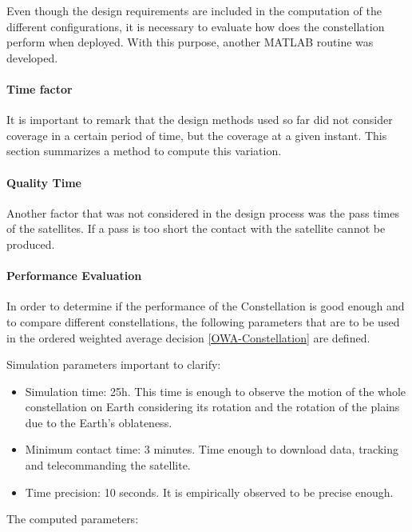 Even though the design requirements are included in the computation of the different configurations, it is necessary to evaluate how does the constellation perform when deployed. With this purpose, another MATLAB routine was developed. 

\paragraph{Time factor}It is important to remark that the design methods used so far did not consider coverage in a certain period of time, but the coverage at a given instant. This section summarizes a method to compute this variation.

\paragraph{Quality Time}Another factor that was not considered in the design process was the pass times of the satellites. If a pass is too short the contact with the satellite cannot be produced. 

\paragraph{Performance Evaluation}In order to determine if the performance of the Constellation is good enough and to compare different constellations, the following parameters that are to be used in the ordered weighted average decision \ref{OWA-Constellation} are defined.

Simulation parameters important to clarify:

\begin{itemize}
\item Simulation time: 25h. This time is enough to observe the motion of the whole constellation on Earth considering its rotation and the rotation of the plains due to the Earth's oblateness.
\item Minimum contact time: 3 minutes. Time enough to download data, tracking and telecommanding the satellite.
\item Time precision: 10 seconds. It is empirically observed to be precise enough.
\end{itemize}

The computed parameters:\label{PerfAnal}

